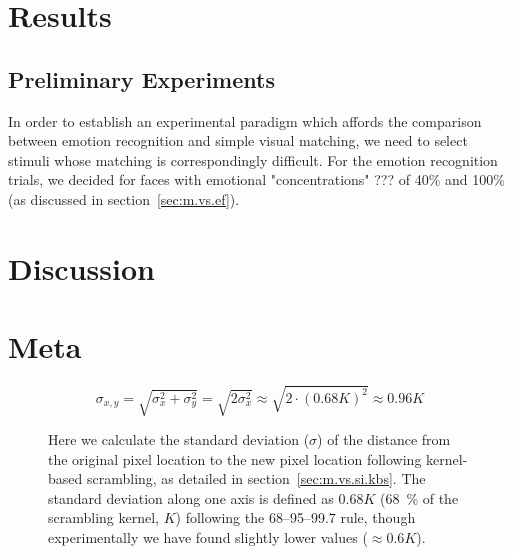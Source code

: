 	    
	    
\chapter{Results}
	\section{Preliminary Experiments}\label{sec:r.pe}
	In order to establish an experimental paradigm which affords the comparison between emotion recognition and simple visual matching, we need to select stimuli whose matching is correspondingly difficult.
	For the emotion recognition trials, we decided for faces with emotional "concentrations" ??? of 40\% and 100\% (as discussed in section~\ref{sec:m.vs.ef}).
\chapter{Discussion}
\chapter{Meta}
\begin{figure}
\[ \sigma_{x,y} = \sqrt{\sigma_{x}^{2}+\sigma_{y}^{2}} = \sqrt{2\sigma_{x}^{2}} \approx \sqrt{2 \cdot (0.68 K)^{2}} \approx 0.96K\]
\caption{Here we calculate the standard deviation ($\sigma$) of the distance from the original pixel location to the new pixel location following kernel-based scrambling, as detailed in section~\ref{sec:m.vs.si.kbs}. The standard deviation along one axis is defined as $0.68K$ (\SI{68}{\percent} of the scrambling kernel, $K$) following the 68–95–99.7 rule, though experimentally we have found slightly lower values ($\approx 0.6K$).}\label{eq:lrgn}
\end{figure}

